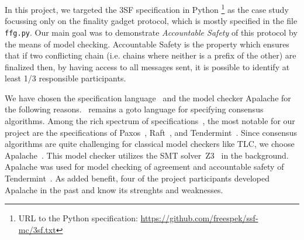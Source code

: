 In this project, we targeted the 3SF specification in Python \footnote{URL to the Python specification:
\url{https://github.com/freespek/ssf-mc/3sf.txt}} as the case study focussing only on the finality gadget protocol, which is mostly specified in the file \texttt{ffg.py}.
Our main goal was to demonstrate 
\emph{Accountable Safety} of this protocol by the means of model checking. 
Accountable Safety is the property which ensures that if two conflicting chain (i.e. chains where neither is a prefix of the other) are finalized then, by having access to all messages sent, it is possible to identify at least 1/3 responsible participants. 



We have chosen the specification language~\tlap{} and the model checker
Apalache for the following reasons.\ \tlap{} remains a goto language for
specifying consensus algorithms. Among the rich spectrum of
specifications~\cite{tla-examples}, the most notable for our project are the
specifications of Paxos~\cite{lamport2001paxos}, Raft~\cite{Ongaro14}, and
Tendermint~\cite{abs-1807-04938,TendermintSpec2020}. Since consensus algorithms
are quite challenging for classical model checkers like TLC, we choose
Apalache~\cite{Apalache2024,KT19,KonnovKM22}. This model checker utilizes the
SMT solver~Z3~\cite{MouraB08} in the background. Apalache was used for model
checking of agreement and accountable safety of
Tendermint~\cite{TendermintSpec2020}. As added benefit, four of the project
participants developed Apalache in the past and know its strenghts and
weaknesses.

